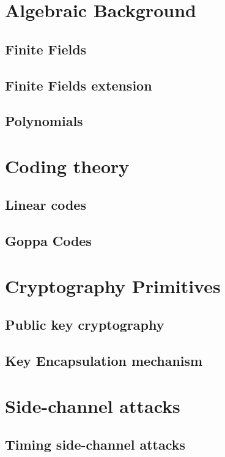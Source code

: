 \section{Algebraic Background}
\subsection{Finite Fields}
\subsection{Finite Fields extension}
\subsection{Polynomials}
\section{Coding theory}
\subsection{Linear codes}
\subsection{Goppa Codes}
\section{Cryptography Primitives}
\subsection{Public key cryptography}
\subsection{Key Encapsulation mechanism}
\section{Side-channel attacks}
\subsection{Timing side-channel attacks}
